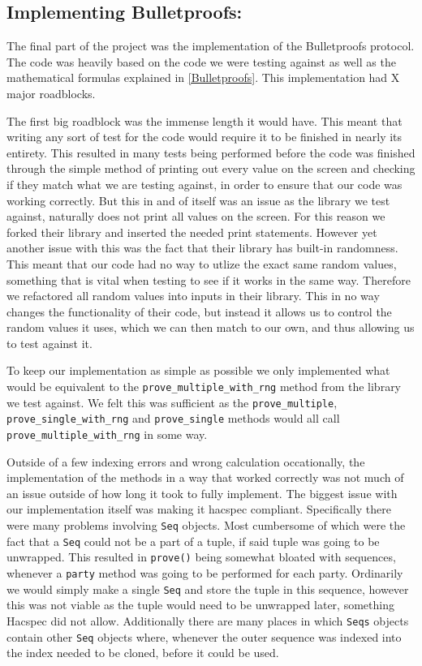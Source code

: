 \documentclass{article}
\begin{document}
\subsection{Implementing Bulletproofs:}

The final part of the project was the implementation of the Bulletproofs protocol. The code was heavily based on the code we were testing against as well as the mathematical formulas explained in \ref*{Bulletproofs}. This implementation had X major roadblocks.

The first big roadblock was the immense length it would have. This meant that writing any sort of test for the code would require it to be finished in nearly its entirety. This resulted in many tests being performed before the code was finished through the simple method of printing out every value on the screen and checking if they match what we are testing against, in order to ensure that our code was working correctly. But this in and of itself was an issue as the library we test against, naturally does not print all values on the screen. For this reason we forked their library and inserted the needed print statements. However yet another issue with this was the fact that their library has built-in randomness. This meant that our code had no way to utlize the exact same random values, something that is vital when testing to see if it works in the same way. Therefore we refactored all random values into inputs in their library. This in no way changes the functionality of their code, but instead it allows us to control the random values it uses, which we can then match to our own, and thus allowing us to test against it. 

To keep our implementation as simple as possible we only implemented what would be equivalent to the \texttt{prove\_multiple\_with\_rng} method from the library we test against. We felt this was sufficient as the \texttt{prove\_multiple}, \texttt{prove\_single\_with\_rng} and \texttt{prove\_single} methods would all call \texttt{prove\_multiple\_with\_rng} in some way.

Outside of a few indexing errors and wrong calculation occationally, the implementation of the methods in a way that worked correctly was not much of an issue outside of how long it took to fully implement. The biggest issue with our implementation itself was making it hacspec compliant. Specifically there were many problems involving \texttt{Seq} objects. Most cumbersome of which were the fact that a \texttt{Seq} could not be a part of a tuple, if said tuple was going to be unwrapped. This resulted in \texttt{prove()} being somewhat bloated with sequences, whenever a \texttt{party} method was going to be performed for each party. Ordinarily we would simply make a single \texttt{Seq} and store the tuple in this sequence, however this was not viable as the tuple would need to be unwrapped later, something Hacspec did not allow. Additionally there are many places in which \texttt{Seqs} objects contain other \texttt{Seq} objects where, whenever the outer sequence was indexed into the index needed to be cloned, before it could be used. 
\end{document}
